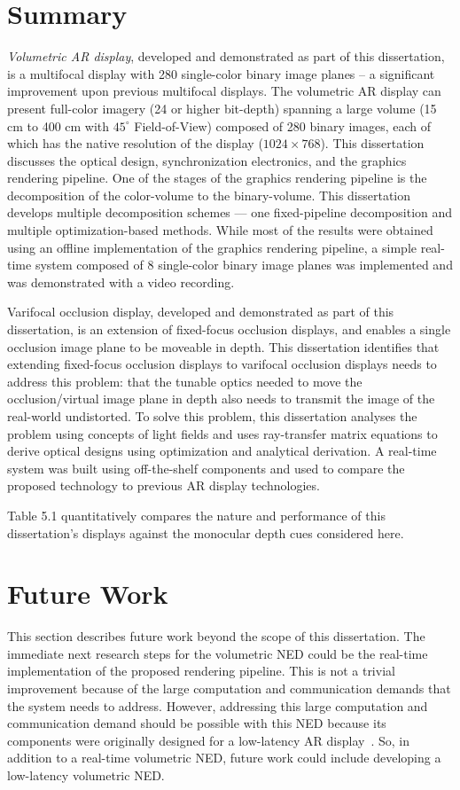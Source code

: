 \section{Summary}


\emph{Volumetric AR display}, developed and demonstrated as part of this dissertation, is a multifocal display with 280 single-color binary image planes – a significant improvement upon previous multifocal displays. The volumetric AR display can present full-color imagery (24 or higher bit-depth) spanning a large volume (15 cm to 400 cm with $45^\circ$ Field-of-View) composed of 280 binary images, each of which has the native resolution of the display ($1024 \times 768$). This dissertation discusses the optical design, synchronization electronics, and the graphics rendering pipeline. One of the stages of the graphics rendering pipeline is the decomposition of the color-volume to the binary-volume. This dissertation develops multiple decomposition schemes --- one fixed-pipeline decomposition and multiple optimization-based methods. While most of the results were obtained using an offline implementation of the graphics rendering pipeline, a simple real-time system composed of 8 single-color binary image planes was implemented and was demonstrated with a video recording. 

Varifocal occlusion display, developed and demonstrated as part of this dissertation, is an extension of fixed-focus occlusion displays, and enables a single occlusion image plane to be moveable in depth. This dissertation identifies that extending fixed-focus occlusion displays to varifocal occlusion displays needs to address this problem: that the tunable optics needed to move the occlusion/virtual image plane in depth also needs to transmit the image of the real-world undistorted. To solve this problem, this dissertation analyses the problem using concepts of light fields and uses ray-transfer matrix equations to derive optical designs using optimization and analytical derivation. A real-time system was built using off-the-shelf components and used to compare the proposed technology to previous AR display technologies.

Table 5.1 quantitatively compares the nature and performance of this dissertation’s displays against the monocular depth cues considered here. 

\section{Future Work}
This section describes future work beyond the scope of this dissertation. 
The immediate next research steps for the volumetric NED could be the real-time implementation of the proposed rendering pipeline. 
This is not a trivial improvement because of the large computation and communication demands that the system needs to address. 
However, addressing this large computation and communication demand should be possible with this NED because its components were originally designed for a low-latency AR display~\cite{Lincoln2016motion}. 
So, in addition to a real-time volumetric NED, future work could include developing a low-latency volumetric NED. 

